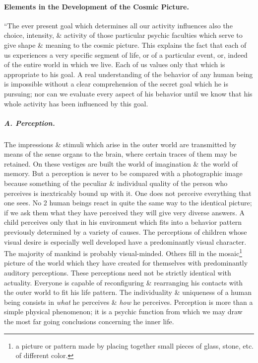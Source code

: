 \documentclass{article}
\begin{document}
\paragraph{Elements in the Development of the Cosmic Picture.} ``The ever present goal which determines all our activity influences also the choice, intensity, \& activity of those particular psychic faculties which serve to give shape \& meaning to the cosmic picture. This explains the fact that each of us experiences a very specific segment of life, or of a particular event, or, indeed of the entire world in which we live. Each of us values only that which is appropriate to his goal. A real understanding of the behavior of any human being is impossible without a clear comprehension of the secret goal which he is pursuing; nor can we evaluate every aspect of his behavior until we know that his whole activity has been influenced by this goal.

\subparagraph{A. Perception.} The impressions \& stimuli which arise in the outer world are transmitted by means of the sense organs to the brain, where certain traces of them may be retained. On these vestiges are built the world of imagination \& the world of memory. But a perception is never to be compared with a photographic image because something of the peculiar \& individual quality of the person who perceives is inextricably bound up with it. One does not perceive everything that one sees. No 2 human beings react in quite the same way to the identical picture; if we ask them what they have perceived they will give very diverse answers. A child perceives only that in his environment which fits into a behavior pattern previously determined by a variety of causes. The perceptions of children whose visual desire is especially well developed have a predominantly visual character. The majority of mankind is probably visual-minded. Others fill in the mosaic\footnote{a picture or pattern made by placing together small pieces of glass, stone, etc. of different color.} picture of the world which they have created for themselves with predominantly auditory perceptions. These perceptions need not be strictly identical with actuality. Everyone is capable of reconfiguring \& rearranging his contacts with the outer world to fit his life pattern. The individuality \& uniqueness of a human being consists in {\it what} he perceives \& {\it how} he perceives. Perception is more than a simple physical phenomenon; it is a psychic function from which we may draw the most far going conclusions concerning the inner life.
\end{document}
